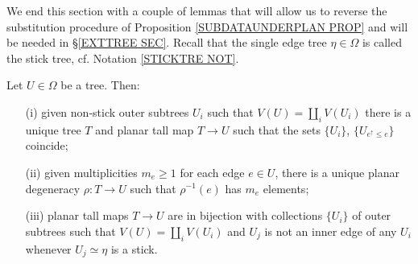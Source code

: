 \documentclass[a4paper,10pt]{article}%
\begin{document}
We end this section with a couple of lemmas that will allow us to reverse the substitution procedure of 
Proposition \ref{SUBDATAUNDERPLAN PROP}
and will be needed in \S \ref{EXTTREE SEC}.
Recall that the single edge tree $\eta \in \Omega$ is called the stick tree,
cf. Notation \ref{STICKTRE NOT}.

\begin{proposition}\label{BUILDABLE PROP}
	Let $U \in \Omega$ be a tree. Then:
\begin{itemize}
	\item[(i)] given non-stick outer subtrees $U_i$ such that 
	$V(U) = \coprod_i V(U_i)$ there is a unique tree $T$ and planar tall map $T \to U$ such that the sets $\{U_i\}$, $\{U_{e^{\uparrow}\leq e}\}$ coincide;
	\item[(ii)] given multiplicities $m_e \geq 1$ for each edge $e \in U$, there is a unique planar degeneracy $\rho \colon T \to U$ such that $\rho^{-1}(e)$ has $m_e$ elements;
	\item[(iii)] planar tall maps $T \to U$ are in bijection with collections $\{U_i\}$ of outer subtrees such that $V(U) = \coprod_i V(U_i)$ and $U_j$ is not an inner edge of any $U_i$ whenever $U_j \simeq \eta$ is a stick.
\end{itemize}
\end{proposition}
\end{document}
